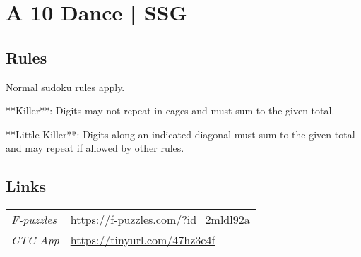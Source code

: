 \section{A 10 Dance | {\normalfont SSG}}
\label{sec:35-a-10-dance-ssg}

\subsection*{Rules}
\begin{markdown}
Normal sudoku rules apply.



**Killer**: Digits may not repeat in cages and must sum to the given total.



**Little Killer**: Digits along an indicated diagonal must sum to the given total and may repeat if allowed by other rules.
\end{markdown}
\subsection*{Links}
\begin{tabularx}{\textwidth}{l X}
\emph{F-puzzles} & \url{https://f-puzzles.com/?id=2mldl92a} \\
\emph{CTC App} & \url{https://tinyurl.com/47hz3c4f} \\
\end{tabularx}
\pagebreak
